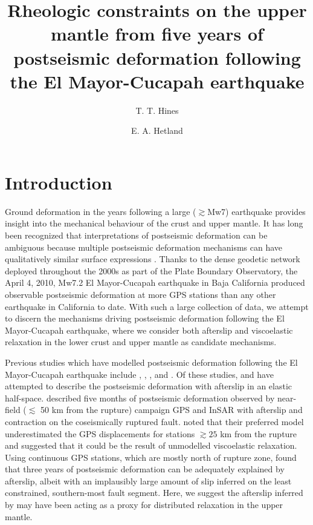 \documentclass[review]{elsarticle}
\title{	
Rheologic constraints on the upper mantle from five years of postseismic deformation following the El Mayor-Cucapah earthquake}
\author{T. T. Hines\fnref{fn}}
\author{E. A. Hetland\fnref{fn}}
\begin{document}
\begin{abstract}
\end{abstract}
\maketitle

\section{Introduction}
Ground deformation in the years following a large ($\gtrsim$Mw7) earthquake provides insight into the mechanical behaviour of the crust and upper mantle. It has long been recognized that interpretations of postseismic deformation can be ambiguous because multiple postseismic deformation mechanisms can have qualitatively similar surface expressions \citep[e.g.][]{Savage1990}. Thanks to the dense geodetic network deployed throughout the 2000s as part of the Plate Boundary Observatory, the April 4, 2010, Mw7.2 El Mayor-Cucapah earthquake in Baja California produced observable postseismic deformation at more GPS stations than any other earthquake in California to date. With such a large collection of data, we attempt to discern the mechanisms driving postseismic deformation following the El Mayor-Cucapah earthquake, where we consider both afterslip and viscoelastic relaxation in the lower crust and upper mantle as candidate mechanisms. 

Previous studies which have modelled postseismic deformation following the El Mayor-Cucapah earthquake include \citet{Pollitz2012}, \citet{Gonzalez-ortega2014}, \citet{Spinler2015}, and \citet{Rollins2015}. Of these studies, \citet{Gonzalez-ortega2014} and \citet{Rollins2015} have attempted to describe the postseismic deformation with afterslip in an elastic half-space.  \citet{Gonzalez-ortega2014} described five months of postseismic deformation observed by near-field ($\lesssim$ 50 km from the rupture) campaign GPS and InSAR with afterslip and contraction on the coseismically ruptured fault. \citet{Gonzalez-ortega2014} noted that their preferred model underestimated the GPS displacements for stations $\gtrsim 25$ km from the rupture and suggested that it could be the result of unmodelled viscoelastic relaxation.  Using continuous GPS stations, which are mostly north of rupture zone, \citet{Rollins2015} found that three years of postseismic deformation can be adequately explained by afterslip, albeit with an implausibly large amount of slip inferred on the least constrained, southern-most fault segment. Here, we suggest the afterslip inferred by \cite{Rollins2015} may have been acting as a proxy for distributed relaxation in the upper mantle. 
\end{document}
